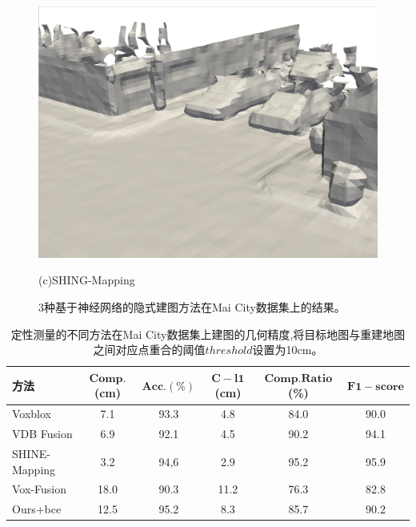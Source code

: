 \begin{figure}[htbp]
\begin{minipage}{0.5\linewidth}
    \includegraphics[width=1\linewidth]{figures/mai_2_shine.png}
    \end{minipage}\caption*{(c)SHING-Mapping}
    \caption{3种基于神经网络的隐式建图方法在Mai City数据集上的结果。}\label{mairesult}
\end{figure}
\begin{table}[htbp]
    \centering
    \caption{定性测量的不同方法在Mai City数据集上建图的几何精度,将目标地图与重建地图之间对应点重合的阈值$threshold$设置为10cm。}\label{maicitymetric}
    \begin{tabular}[htbp]{llccccc}
        \toprule
        \multicolumn{2}{l}{方法} & $\mathbf{Comp.}$(cm) & $\mathbf{Acc.}(\%)$ & $\mathbf{C-l1}$(cm) &  $\mathbf{Comp. Ratio}$(\%) &$\mathbf{F1-score}$\\
        \midrule
        \multicolumn{2}{l}{Voxblox} & 7.1 & 93.3 & 4.8 &84.0&90.0\\
        \multicolumn{2}{l}{VDB Fusion} & 6.9&92.1&4.5&90.2&94.1 \\
        \multicolumn{2}{l}{SHINE-Mapping} & 3.2&94,6&2.9&95.2&95.9 \\
        \multicolumn{2}{l}{Vox-Fusion} & 18.0 & 90.3 &11.2&76.3&82.8\\
        \midrule
        \multicolumn{2}{l}{Ours+bce} & 12.5&95.2 &8.3&85.7&90.2\\
        \bottomrule
    \end{tabular}
\end{table}
